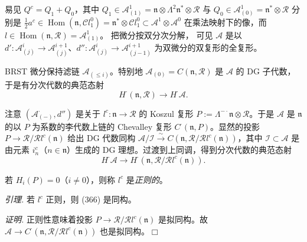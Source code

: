易见 $Q^{c}=Q_1+Q_0$，其中 $Q_1\in\mathcal{A}^{1}_{(1)}=\mathfrak{n}\otimes\Lambda^{2}\mathfrak{n}^{*}\otimes\mathcal{R}$ 与 $Q_0\in\mathcal{A}^{1}_{(0)}=\mathfrak{n}^{*}\otimes\mathcal{R}$ 分别是 $\frac{1}{2}a^{c}\in\operatorname{Hom}(\mathfrak{n},\mathcal{C}l^{0}_1)=\mathfrak{n}^{*}\otimes\mathcal{C}l^{0}_1\subset\mathcal{A}^{1}\otimes\mathcal{A}^{0}$ 在乘法映射下的像，而 $l\in\operatorname{Hom}(\mathfrak{n},\mathcal{R})=\mathcal{A}^{1}_{(1)}$。
把微分按双分次分解，%
可见 $\mathcal{A}$ 是以 $d':\mathcal{A}^{i}_{(j)}\to\mathcal{A}^{i+1}_{(j)}$、$d'':\mathcal{A}^{i}_{(j)}\to\mathcal{A}^{i+1}_{(j-1)}$ 为双微分的双复形的全复形。

BRST 微分保持滤链 $\mathcal{A}_{(\le i)}$。特别地 $\mathcal{A}_{(0)}=C(\mathfrak{n},\mathcal{R})$ 是 $\mathcal{A}$ 的 DG 子代数，于是有分次代数的典范态射
\begin{equation}\tag{365}
H^{\cdot}(\mathfrak{n},\mathcal{R})\to H^{\cdot}\mathcal{A}.
\end{equation}

注意 $(\mathcal{A}^{\cdot}_{(-)},d'')$ 是关于 $l^{c}:\mathfrak{n}\to\mathcal{R}$ 的 Koszul 复形 $P:=\Lambda^{-\cdot}\mathfrak{n}\otimes\mathcal{R}$。于是 $\mathcal{A}$ 是 $\mathfrak{n}$ 的以 $P$ 为系数的李代数上链的 Chevalley 复形 $C^{\cdot}(\mathfrak{n},P)$。显然的投影 $P\to\mathcal{R}/\mathcal{R}l^{c}(\mathfrak{n})$ 给出 DG 代数同构 $\mathcal{A}/\mathcal{I}\xrightarrow{\sim}C(\mathfrak{n},\mathcal{R}/\mathcal{R}l^{c}(\mathfrak{n}))$，其中 $\mathcal{I}\subset\mathcal{A}$ 是由元素 $i^{c}_n$（$n\in\mathfrak{n}$）生成的 DG 理想。过渡到上同调，得到分次代数的典范态射
\begin{equation}\tag{366}
H^{\cdot}\mathcal{A}\to H^{\cdot}(\mathfrak{n},\mathcal{R}/\mathcal{R}l^{c}(\mathfrak{n})).
\end{equation}

若 $H_i(P)=0$（$i\ne0$），则称 $l^{c}$ 是\emph{正则的}。

 \emph{引理.} 若 $l^{c}$ 正则，则 (366) 是同构。

\emph{证明.} 正则性意味着投影 $P\to\mathcal{R}/\mathcal{R}l^{c}(\mathfrak{n})$ 是拟同构。故 $\mathcal{A}\to C^{\cdot}(\mathfrak{n},\mathcal{R}/\mathcal{R}l^{c}(\mathfrak{n}))$ 也是拟同构。\hfill$\Box$

